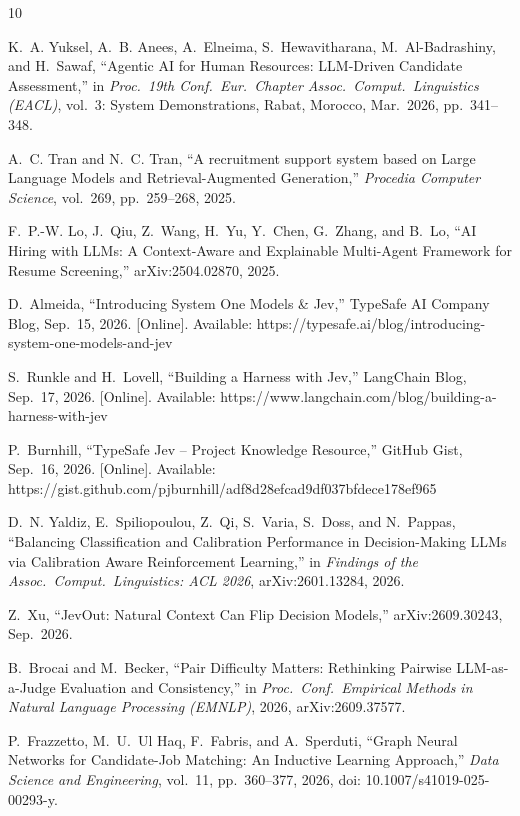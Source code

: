 \documentclass[journal]{IEEEtran}
\begin{document}
\begin{thebibliography}{10}

K.~A. Yuksel, A.~B. Anees, A.~Elneima, S.~Hewavitharana, M.~Al-Badrashiny, and H.~Sawaf, ``Agentic AI for Human Resources: LLM-Driven Candidate Assessment,'' in \emph{Proc.\ 19th Conf.\ Eur.\ Chapter Assoc.\ Comput.\ Linguistics (EACL)}, vol.~3: System Demonstrations, Rabat, Morocco, Mar.~2026, pp.~341--348.

A.~C. Tran and N.~C. Tran, ``A recruitment support system based on Large Language Models and Retrieval-Augmented Generation,'' \emph{Procedia Computer Science}, vol.~269, pp.~259--268, 2025.

F.~P.-W. Lo, J.~Qiu, Z.~Wang, H.~Yu, Y.~Chen, G.~Zhang, and B.~Lo, ``AI Hiring with LLMs: A Context-Aware and Explainable Multi-Agent Framework for Resume Screening,'' arXiv:2504.02870, 2025.

D.~Almeida, ``Introducing System One Models \& Jev,'' TypeSafe AI Company Blog, Sep.~15, 2026. [Online]. Available: https://typesafe.ai/blog/introducing-system-one-models-and-jev

S.~Runkle and H.~Lovell, ``Building a Harness with Jev,'' LangChain Blog, Sep.~17, 2026. [Online]. Available: https://www.langchain.com/blog/building-a-harness-with-jev

P.~Burnhill, ``TypeSafe Jev -- Project Knowledge Resource,'' GitHub Gist, Sep.~16, 2026. [Online]. Available: https://gist.github.com/pjburnhill/adf8d28efcad9df037bfdece178ef965

D.~N. Yaldiz, E.~Spiliopoulou, Z.~Qi, S.~Varia, S.~Doss, and N.~Pappas, ``Balancing Classification and Calibration Performance in Decision-Making LLMs via Calibration Aware Reinforcement Learning,'' in \emph{Findings of the Assoc.\ Comput.\ Linguistics: ACL 2026}, arXiv:2601.13284, 2026.

Z.~Xu, ``JevOut: Natural Context Can Flip Decision Models,'' arXiv:2609.30243, Sep.~2026.

B.~Brocai and M.~Becker, ``Pair Difficulty Matters: Rethinking Pairwise LLM-as-a-Judge Evaluation and Consistency,'' in \emph{Proc.\ Conf.\ Empirical Methods in Natural Language Processing (EMNLP)}, 2026, arXiv:2609.37577.

P.~Frazzetto, M.~U.~Ul Haq, F.~Fabris, and A.~Sperduti, ``Graph Neural Networks for Candidate-Job Matching: An Inductive Learning Approach,'' \emph{Data Science and Engineering}, vol.~11, pp.~360--377, 2026, doi: 10.1007/s41019-025-00293-y.


\end{thebibliography}
\end{document}
